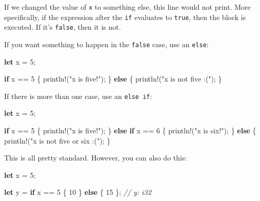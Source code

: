 \documentclass[a4paper,]{book}
\newenvironment{Shaded}{\begin{snugshade}}{\end{snugshade}}
\newcommand{\KeywordTok}[1]{\textcolor[rgb]{0.13,0.29,0.53}{\textbf{{#1}}}}
\newcommand{\DecValTok}[1]{\textcolor[rgb]{0.00,0.00,0.81}{{#1}}}
\newcommand{\StringTok}[1]{\textcolor[rgb]{0.31,0.60,0.02}{{#1}}}
\newcommand{\CommentTok}[1]{\textcolor[rgb]{0.56,0.35,0.01}{\textit{{#1}}}}
\newcommand{\OtherTok}[1]{\textcolor[rgb]{0.56,0.35,0.01}{{#1}}}
\newcommand{\NormalTok}[1]{{#1}}
\begin{document}
If we changed the value of \texttt{x} to something else, this line would
not print. More specifically, if the expression after the \texttt{if}
evaluates to \texttt{true}, then the block is executed. If it's
\texttt{false}, then it is not.

If you want something to happen in the \texttt{false} case, use an
\texttt{else}:

\begin{Shaded}
\begin{Highlighting}[]
\KeywordTok{let} \NormalTok{x = }\DecValTok{5}\NormalTok{;}

\KeywordTok{if} \NormalTok{x == }\DecValTok{5} \NormalTok{\{}
    \OtherTok{println!}\NormalTok{(}\StringTok{"x is five!"}\NormalTok{);}
\NormalTok{\} }\KeywordTok{else} \NormalTok{\{}
    \OtherTok{println!}\NormalTok{(}\StringTok{"x is not five :("}\NormalTok{);}
\NormalTok{\}}
\end{Highlighting}
\end{Shaded}

If there is more than one case, use an \texttt{else\ if}:

\begin{Shaded}
\begin{Highlighting}[]
\KeywordTok{let} \NormalTok{x = }\DecValTok{5}\NormalTok{;}

\KeywordTok{if} \NormalTok{x == }\DecValTok{5} \NormalTok{\{}
    \OtherTok{println!}\NormalTok{(}\StringTok{"x is five!"}\NormalTok{);}
\NormalTok{\} }\KeywordTok{else} \KeywordTok{if} \NormalTok{x == }\DecValTok{6} \NormalTok{\{}
    \OtherTok{println!}\NormalTok{(}\StringTok{"x is six!"}\NormalTok{);}
\NormalTok{\} }\KeywordTok{else} \NormalTok{\{}
    \OtherTok{println!}\NormalTok{(}\StringTok{"x is not five or six :("}\NormalTok{);}
\NormalTok{\}}
\end{Highlighting}
\end{Shaded}

This is all pretty standard. However, you can also do this:

\begin{Shaded}
\begin{Highlighting}[]
\KeywordTok{let} \NormalTok{x = }\DecValTok{5}\NormalTok{;}

\KeywordTok{let} \NormalTok{y = }\KeywordTok{if} \NormalTok{x == }\DecValTok{5} \NormalTok{\{}
    \DecValTok{10}
\NormalTok{\} }\KeywordTok{else} \NormalTok{\{}
    \DecValTok{15}
\NormalTok{\}; }\CommentTok{// y: i32}
\end{Highlighting}
\end{Shaded}
\end{document}
